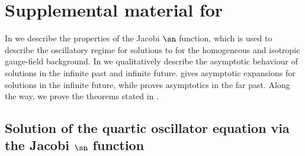 
\section{\label{app:sec3}Supplemental material for }

In  we describe the properties of the Jacobi $\sn$ function, which is used to describe the oscillatory regime for solutions to  for the homogeneous and isotropic gauge-field background. In  we qualitatively describe the asymptotic behaviour of solutions in the infinite past and infinite future.  gives asymptotic expansions for solutions in the infinite future, while  proves asymptotics in the far past. Along the way, we prove the theorems stated in .

\subsection{\label{app:Jacobi}Solution of the quartic oscillator equation via the Jacobi \texorpdfstring{$\sn$}{sn} function}

